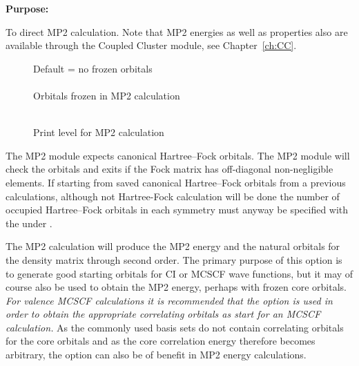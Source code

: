 {\bf Purpose:}

To direct MP2 calculation. Note that MP2 energies as well as
properties also are available through the Coupled Cluster module, see
Chapter~\ref{ch:CC}.

\begin{description}
\item[]
  Default = no frozen orbitals\\
   \\
  Orbitals frozen in MP2 calculation

\item[]
   \\
  Print level for MP2 calculation
\end{description}




The MP2 module expects canonical Hartree--Fock orbitals. The MP2 module will
check the orbitals and exits if the Fock matrix has off-diagonal non-negligible
elements.
If starting from saved canonical Hartree--Fock orbitals from a previous calculations,
although not Hartree-Fock calculation will be done
the number of occupied Hartree--Fock orbitals in each symmetry must anyway be
specified with the  under .

The MP2 calculation will produce the MP2 energy and the natural orbitals
for the density matrix through second order.  The primary purpose of
this option is to generate good starting orbitals for CI or MCSCF wave
functions, but it
may of course also be used to obtain the MP2 energy, perhaps with frozen
core orbitals. {\em For valence MCSCF calculations it is recommended that the
 option is used in order to obtain the appropriate
correlating orbitals as start
for an MCSCF calculation.\/}  As the commonly
used basis sets do not contain correlating orbitals for the core
orbitals and as the core correlation energy therefore becomes arbitrary,
the  option can also be of benefit in MP2 energy
calculations.

\pagebreak[3]
\subsection{\label{ref-nevpt2inp}}


